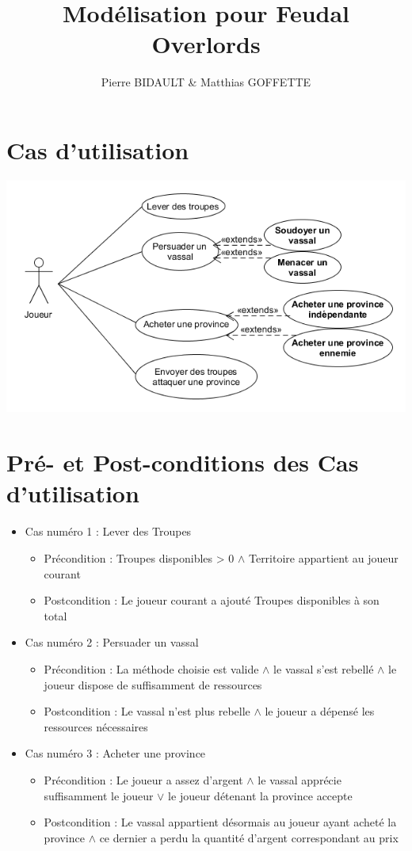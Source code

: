 \documentclass[12pt,a4paper]{article}
\author{Pierre BIDAULT \& Matthias GOFFETTE}
\title{Modélisation pour Feudal Overlords}
\begin{document}
\maketitle

\section{Cas d'utilisation}

\includegraphics[scale=0.7]{Diagramme_Cas_Utilisation/Diagramme_Cas_Utilisation.png}

\newpage

\section{Pré- et Post-conditions des Cas d'utilisation}

\begin{itemize}
\item Cas numéro 1 : Lever des Troupes
	\begin{itemize}
	\item Précondition : Troupes disponibles > 0 $ \land $ Territoire appartient au joueur courant
	\item Postcondition : Le joueur courant a ajouté Troupes disponibles à son total
	\end{itemize}
\item Cas numéro 2 : Persuader un vassal
	\begin{itemize}
	\item Précondition : La méthode choisie est valide $ \land $ le vassal s'est rebellé $ \land $ le joueur dispose de suffisamment de ressources
	\item Postcondition : Le vassal n'est plus rebelle $ \land $ le joueur a dépensé les ressources nécessaires
	\end{itemize}
\item Cas numéro 3 : Acheter une province
	\begin{itemize}
	\item Précondition : Le joueur a assez d'argent $ \land $ le vassal apprécie suffisamment le joueur $ \lor $ le joueur détenant la province accepte
	\item Postcondition : Le vassal appartient désormais au joueur ayant acheté la province $ \land $ ce dernier a perdu la quantité d'argent correspondant au prix
	\end{itemize}
\end{itemize}
\end{document}
